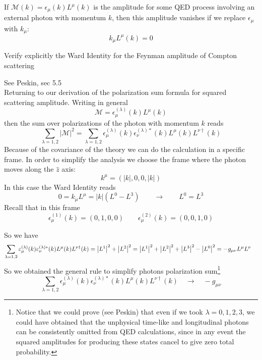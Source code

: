 \documentclass[TheoreticalPhy_ModB.tex]{subfiles}
\begin{document}

\begin{mdframed}[style=mybox]
If $\mathcal M(k)=\epsilon_\mu(k)L^\mu(k)$ is the amplitude for some QED process involving an external photon with momentum $k$, then this amplitude vanishes if we replace $\epsilon_\mu$ with $k_\mu$:
\[k_\mu L^\mu(k)=0\]
\end{mdframed}

\begin{exercise}
Verify explicitly the Ward Identity for the Feynman amplitude of Compton scattering
\end{exercise}

\textsf{See Peskin, sec 5.5}\\
Returning to our derivation of the polarization sum formula for squared scattering amplitude. Writing in general
\[\mathcal M=\epsilon_\mu^{(\lambda)}(k)L^\mu(k)\]
then the sum over polarizations of the photon with momentum $k$ reads
\[\sum_{\lambda=1,2}|\mathcal M|^2=\sum_{\lambda=1,2}\epsilon_\mu^{(\lambda)}(k)\epsilon_\nu^{(\lambda)*}(k)L^\mu(k)L^{\nu\dagger}(k)\]
Because of the covariance of the theory we can do the calculation in a specific frame. In order to simplify the analysis we choose the frame where the photon moves along the $\hat z$ axis:
\[k^\mu=(|k|,0,0,|k|)\]
In this case the Ward Identity reads
\[0=k_\mu L^\mu=|k|\left(L^0-L^3\right)\qquad\longrightarrow\qquad L^0=L^3\]
Recall that in this frame
\[\epsilon_\mu^{(1)}(k)=(0,1,0,0)\qquad\epsilon_\mu^{(2)}(k)=(0,0,1,0)\]

So we have
\begin{align*}\sum_{\lambda=1,2}\varepsilon_\mu^{(\lambda)}(k)\varepsilon_\nu^{(\lambda)*}(k)L^\mu(k)L^{\nu\dagger}(k)&=\left\lvert L^1 \right\rvert^2+\left\lvert L^2 \right\rvert^2=\left\lvert L^1 \right\rvert^2+\left\lvert L^2 \right\rvert^2+\left\lvert L^3 \right\rvert^2-\left\lvert L^0 \right\rvert^2=-g_{\mu\nu}L^\mu L^\nu
\end{align*}
So we obtained the general rule to simplify photons polarization sum\footnote{Notice that we could prove (see Peskin) that even if we took $\lambda=0,1,2,3$, we could have obtained that the unphysical time-like and longitudinal photons can be consistently omitted from QED calculations, since in any event the squared amplitudes for producing these states cancel to give zero total probability. }
\[
\boxed{
	\sum_{\lambda=1,2}\epsilon_\mu^{(\lambda)}(k)\epsilon_\nu^{(\lambda)*}(k)L^\mu(k)L^{\nu\dagger}(k)\quad\longrightarrow\quad-g_{\mu\nu}
}
\]
\end{document}
